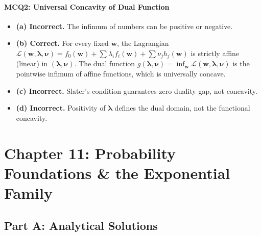 \paragraph{MCQ2: Universal Concavity of Dual Function}
\begin{itemize}
    \item \textbf{(a) Incorrect.} The infimum of numbers can be positive or negative.
    \item \textbf{(b) Correct.} For every fixed $\mathbf{w}$, the Lagrangian $\mathcal{L}(\mathbf{w}, \boldsymbol{\lambda}, \boldsymbol{\nu}) = f_0(\mathbf{w}) + \sum \lambda_i f_i(\mathbf{w}) + \sum \nu_j h_j(\mathbf{w})$ is strictly affine (linear) in $(\boldsymbol{\lambda}, \boldsymbol{\nu})$. The dual function $g(\boldsymbol{\lambda}, \boldsymbol{\nu}) = \inf_{\mathbf{w}} \mathcal{L}(\mathbf{w}, \boldsymbol{\lambda}, \boldsymbol{\nu})$ is the pointwise infimum of affine functions, which is universally concave.
    \item \textbf{(c) Incorrect.} Slater's condition guarantees zero duality gap, not concavity.
    \item \textbf{(d) Incorrect.} Positivity of $\boldsymbol{\lambda}$ defines the dual domain, not the functional concavity.
\end{itemize}

\section*{Chapter 11: Probability Foundations \& the Exponential Family}

\subsection*{Part A: Analytical Solutions}

